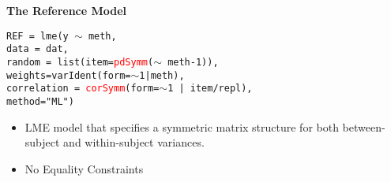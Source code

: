 \documentclass[compress]{beamer}        %
\makeatletter
\newcommand{\tcb}{\textcolor{beamer@blendedblue}}
\newcommand{\tcr}{\textcolor{red}}
\makeatother
\begin{document}
%		


		\begin{frame}[fragile]{\bf \tcb{The Reference Model}}
				\vspace{-1cm}
			\begin{framed}
			\texttt{REF = lme(y $\sim$ meth,\\
				\hspace{0.6cm} data = dat,\\
				\hspace{0.6cm} random = list(item=\tcr{pdSymm}($\sim$ meth-1)), \\
				\hspace{0.6cm} weights=varIdent(form=$\sim$1|meth),\\
				\hspace{0.6cm} correlation = \tcr{corSymm}(form=$\sim$1 | item/repl),\\
				\hspace{0.6cm} method="ML")}\\
			\end{framed}
			\begin{itemize}
				\item LME model that specifies a symmetric matrix structure for both between-subject and within-subject variances.
				\item No Equality Constraints
			\end{itemize}
			
		\end{frame}
		
\end{document}

